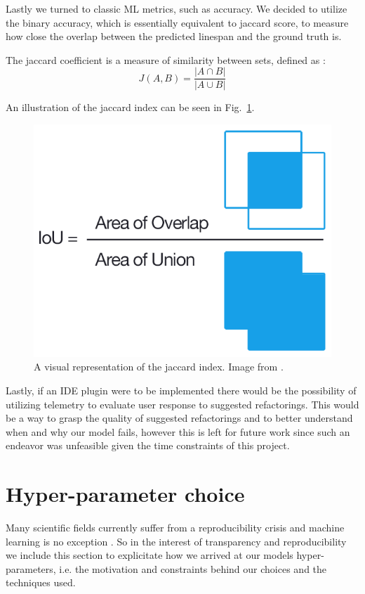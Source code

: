 Lastly we turned to classic ML metrics, such as accuracy.
We decided to utilize the binary accuracy, which is essentially equivalent to jaccard score, to measure how close the overlap between the predicted linespan and the ground truth is.

The jaccard coefficient is a measure of similarity between sets, defined as \citep{jaccard1912distribution}:
$$J(A,B) = \frac{|A \cap B|}{|A \cup B|} $$

An illustration of the jaccard index can be seen in Fig.~\ref{fig:jaccard_iou}.

\begin{figure}[!ht]
\centerline{\includegraphics[scale=0.4]{figuras/iou.png}   }
\caption{A visual representation of the jaccard index. Image from \citet{iou}.}
\label{fig:jaccard_iou}
\end{figure}


Lastly, if an IDE plugin were to be implemented there would be the possibility of utilizing telemetry to evaluate user response to suggested refactorings. This would be a way to grasp the quality of suggested refactorings and to better understand when and why our model fails, however this is left for future work since such an endeavor was unfeasible given the time constraints of this project.


\section{Hyper-parameter choice}
\label{optuna}

Many scientific fields currently suffer from a reproducibility crisis \citep{reproducibility} and machine learning is no exception \citep{repro1, repro2, repro3, repro4}. So in the interest of transparency and reproducibility we include this section to explicitate how we arrived at our models hyper-parameters, i.e. the motivation and constraints behind our choices and the techniques used.


